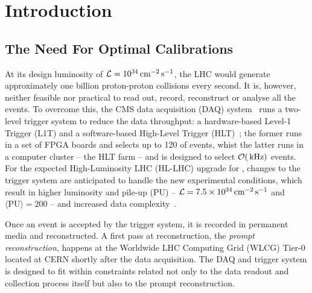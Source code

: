 \chapter{Introduction}

\section{The Need For Optimal Calibrations}
At its design luminosity of $\mathcal{L} = 10^{34}\,\text{cm}^{-2}\,\text{s}^{-1}$, the LHC would generate approximately one billion proton-proton collisions every second. It is, however, neither feasible nor practical to read out, record, reconstruct or analyse all the events. To overcome this, the CMS data acquisition (DAQ) system~\cite{CMS:2008xjf,CMS:2023gfb} runs a two-level trigger system to reduce the data throughput: a hardware-based Level-1 Trigger (L1T) and a software-based High-Level Trigger (HLT)~\cite{CMS:2016ngn}; the former runs in a set of FPGA boards and selects up to 120 \kHz of events, whist the latter runs in a computer cluster -- the HLT farm -- and is designed to select $\mathcal{O}(\,\text{kHz})$ events. For the expected High-Luminosity LHC (HL-LHC) upgrade for \Phasetwo, changes to the trigger system are anticipated to handle the new experimental conditions, which result in higher luminosity and pile-up (PU) --
$\mathcal{L} = 7.5\times10^{34}\,\text{cm}^{-2}\,\text{s}^{-1}$
and
$\langle\text{PU}\rangle = 200$ --
and increased data complexity~\cite{Collaboration:2759072, CERN-LHCC-2020-004}.

Once an event is accepted by the trigger system, it is recorded in permanent media and reconstructed. A first pass at reconstruction, the \emph{prompt reconstruction}, happens at the Worldwide LHC Computing Grid (WLCG) Tier-0 located at CERN shortly after the data acquisition. The DAQ and trigger system is designed to fit within constraints related not only to the data readout and collection process itself but also to the prompt reconstruction.

